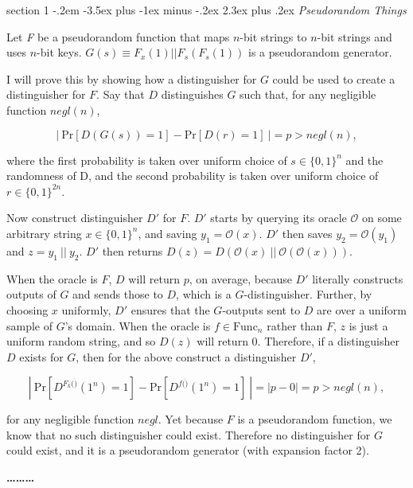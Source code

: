 \documentclass[12pt]{article}
\makeatletter
\newenvironment{problem}{\@startsection
       {section}
       {1}
       {-.2em}
       {-3.5ex plus -1ex minus -.2ex}
       {2.3ex plus .2ex}
       {\pagebreak[3]%
       \large\bf\noindent{Problem }
       }
       }
       {%
       \begin{center}\large\bf \ldots\ldots\ldots\end{center}}
\makeatother
\begin{document}
\begin{problem}{\it Pseudorandom Things}

Let \emph{F} be a pseudorandom function that maps $n$-bit strings to $n$-bit strings and uses $n$-bit keys. $G(s)\equiv F_x(1)||F_s(F_s(1))$ is a pseudorandom generator.

I will prove this by showing how a distinguisher for $G$ could be used to create a distinguisher for $F$. Say that $D$ distinguishes $G$ such that, for any negligible function $negl(n)$,

\begin{equation} \label{eq:D}
\left|\ \text{Pr}[D(G(s))=1]-\text{Pr}[D(r)=1]\ \right |=p > negl(n),
\end{equation}

where the first probability is taken over uniform choice of $s\in\{0,1\}^n$ and the randomness of D, and the second probability is taken over uniform choice of $r \in \{0,1\}^{2n}$.

Now construct distinguisher $D'$ for $F$. $D'$ starts by querying its oracle $\mathcal{O}$ on some arbitrary string $x \in \{0,1\}^n$, and saving $y_1 = \mathcal{O}(x)$. $D'$ then saves $y_2 = \mathcal{O}(y_1)$ and $z = y_1\ ||\ y_2$. $D'$ then returns $D(z) = D(\mathcal{O}(x)\ ||\ \mathcal{O}(\mathcal{O}(x)))$.

When the oracle is $F$, $D$ will return $p$, on average, because $D'$ literally constructs outputs of $G$ and sends those to $D$, which is a $G$-distinguisher. Further, by choosing $x$ uniformly, $D'$ ensures that the $G$-outputs sent to $D$ are over a uniform sample of $G$'s domain. When the oracle is $f \in \text{Func}_n$ rather than $F$, $z$ is just a uniform random string,%
and so $D(z)$ will return 0. Therefore, if a distinguisher $D$ exists for $G$, then for the above construct a distinguisher $D'$,

\begin{equation} \label{eq:D'}
\left|\ \text{Pr}[D^{F_k(\dot )}(1^n)=1] -\text{Pr}[D^{f(\dot )}(1^n)=1]\ \right |= |p-0|=p > negl(n),
\end{equation}

for any negligible function $negl$. Yet because $F$ is a pseudorandom function, we know that no such distinguisher could exist. Therefore no distinguisher for $G$ could exist, and it is a pseudorandom generator (with expansion factor 2).
\end{problem}
\end{document}
